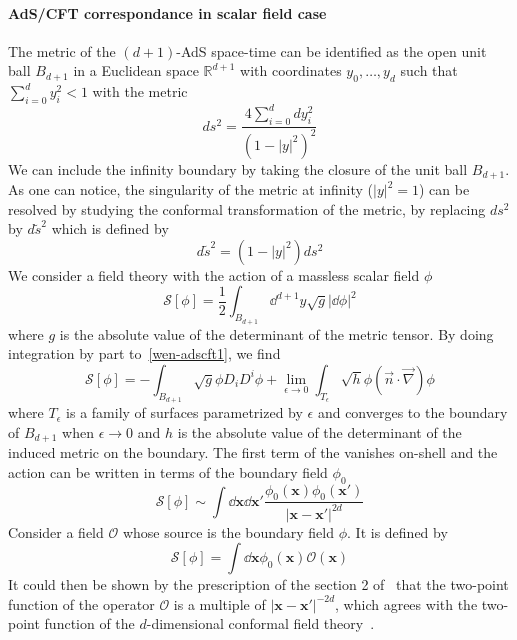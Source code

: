 \paragraph{AdS/CFT correspondance in scalar field case}
The metric of the $(d+1)$-AdS space-time can be identified as the open unit ball $B_{d+1}$ in a Euclidean space $\mathbb{R}^{d+1}$ with coordinates $y_0, \ldots, y_d$ such that $\sum_{i=0}^d y_i^2 <1$ with the metric
\begin{equation*}
ds^2 = \frac{4\sum_{i=0}^d dy_i^2}{(1 - |y|^2)^2}
\end{equation*}
We can include the infinity boundary by taking the closure of the unit ball $B_{d+1}$. 
As one can notice, the singularity of the metric at infinity ($|y|^2 = 1$) can be resolved by studying the conformal transformation of the metric, 
\ie by replacing $ds^2$ by $d\tilde{s}^2$ which is defined by
\begin{equation*}
d\tilde{s}^2 = (1 - |y|^2) ds^2
\end{equation*}
We consider a field theory with the action of a massless scalar field $\phi$
\begin{equation}\label{wen-adscft1}
\mathcal{S}[\phi] = \frac 1 2 \int_{B_{d+1}} \dd^{d+1} y \sqrt{g} |\dd \phi|^2
\end{equation}
where $g$ is the absolute value of the determinant of the metric tensor.
By doing integration by part to~\cref{wen-adscft1}, we find
\begin{equation*}
\mathcal{S}[\phi] = -\int_{B_{d+1}} \sqrt{g} \phi D_i D^i \phi + 
\lim_{\epsilon\rightarrow 0}\int_{T_\epsilon}  \sqrt{h} \phi (\vec{n}\cdot\vec{\nabla})\phi
\end{equation*}
where $T_\epsilon$ is a family of surfaces parametrized by $\epsilon$ and converges to the boundary of $B_{d+1}$ when $\epsilon\rightarrow 0$ and $h$ is the absolute value of the determinant of the induced metric on the boundary.
The first term of the \rhs vanishes on-shell and the action can be written in terms of the boundary field $\phi_0$
\begin{equation*}
\mathcal{S}[\phi] \sim \int \dd \mathbf{x} \dd \mathbf{x}' 
\frac{\phi_0(\mathbf{x})\phi_0(\mathbf{x}')}{|\mathbf{x} - \mathbf{x}'|^{2d}}
\end{equation*}
Consider a field $\mathcal{O}$ whose source is the boundary field $\phi$. 
It is defined by~\cite{Gubser1998}
\begin{equation*}
\mathcal{S}[\phi] = \int \dd \mathbf{x} \phi_0(\mathbf{x})\mathcal{O}(\mathbf{x})
\end{equation*}
It could then be shown by the prescription of the section 2 of~\cite{Skenderis2002} that the two-point function of the operator $\mathcal{O}$ is a multiple of $|\mathbf{x} - \mathbf{x}'|^{-2d}$, which agrees with the two-point function of the $d$-dimensional conformal field theory~\cite{Qualls2015}. \\\\
%
%











